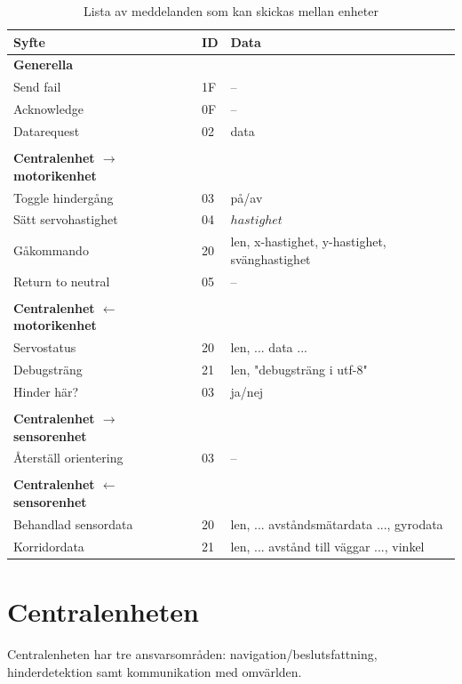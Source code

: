 \documentclass[a4paper,titlepage,12pt]{article}
\begin{document}
	\begin{table}
		\begin{longtable}[c]{ l l l }
			\textbf{Syfte} & \textbf{ID} & \textbf{Data} \\ \midrule
			\textbf{Generella} \\ \midrule
			Send fail & 1F & -- \\ \midrule
			Acknowledge & 0F & -- \\ \midrule
			Datarequest & 02 & data \\ \midrule
			\\
			\textbf{Centralenhet $ \to $ motorikenhet}\\ \midrule
			Toggle hindergång & 03 & på/av \\ \midrule
			Sätt servohastighet & 04 & $ hastighet $ \\ \midrule
			Gåkommando &  20 & len, x-hastighet, y-hastighet, svänghastighet \\ \midrule
			Return to neutral & 05 & -- \\ \midrule
			\\
			\textbf{Centralenhet $ \gets $ motorikenhet}\\ \midrule
			Servostatus & 20 & len, ... data ... \\ \midrule
			Debugsträng & 21 & len, "debugsträng i utf-8" \\ \midrule
			Hinder här? & 03 & ja/nej \\ \midrule
			\\
			\textbf{Centralenhet $\to$ sensorenhet} \\ \midrule
			Återställ orientering & 03 & -- \\ \midrule
			\\
			\textbf{Centralenhet $ \gets $ sensorenhet}\\ \midrule
			Behandlad sensordata & 20 & len, ... avståndsmätardata ..., gyrodata \\ \midrule
			Korridordata		 & 21 & len, ... avstånd till väggar ..., vinkel \\
		\end{longtable}

		\vspace{0.5cm}
		\label{table:messages}
		\caption{Lista av meddelanden som kan skickas mellan enheter}
	\end{table}
	
	
	\section{Centralenheten}
	Centralenheten har tre ansvarsområden: navigation/beslutsfattning, hinderdetektion samt
	kommunikation med omvärlden.
\end{document}
